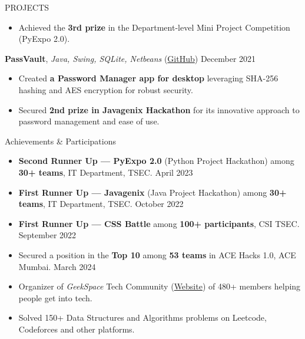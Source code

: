 \documentclass{resume} %
\begin{document}
\begin{rSection}{PROJECTS}
\begin{itemize}
        \item Achieved the \textbf{3rd prize} in the Department-level Mini Project Competition (PyExpo 2.0).
    \end{itemize}
    \item \textbf{PassVault}, \textit{Java, Swing, SQLite, Netbeans} (\href{https://github.com/ninadnaik10/PassVault} {GitHub}) \hfill {December 2021}
    \begin{itemize}
        \setlength\itemsep{-0.6em}
        \item Created \textbf{a Password Manager app for desktop} leveraging SHA-256 hashing and AES encryption for robust security.
        \item Secured \textbf{2nd prize in Javagenix Hackathon} for its innovative approach to password management and ease of use.
    \end{itemize}

\end{rSection}

\begin{rSection}{Achievements \& Participations}
    \begin{itemize}
        \setlength\itemsep{-0.6em}
        \item \textbf{Second Runner Up — PyExpo 2.0} (Python Project Hackathon) among \textbf{30+ teams}, IT Department, TSEC. \hfill {April 2023}
        \item \textbf{First Runner Up — Javagenix} (Java Project Hackathon) among \textbf{30+ teams}, IT Department, TSEC. \hfill {October 2022}
        \item \textbf{First Runner Up — CSS Battle} among \textbf{100+ participants}, CSI TSEC. \hfill {September 2022}
        \item Secured a position in the \textbf{Top 10} among \textbf{53 teams} in ACE Hacks 1.0, ACE Mumbai. \hfill{March 2024}
        \item Organizer of \textit{GeekSpace} Tech Community (\href{https://geekspaceclub.xyz}{Website}) of 480+ members helping people get into tech.
        \item Solved 150+ Data Structures and Algorithms problems on Leetcode, Codeforces and other platforms.
    \end{itemize}


\end{rSection}



\end{document}
